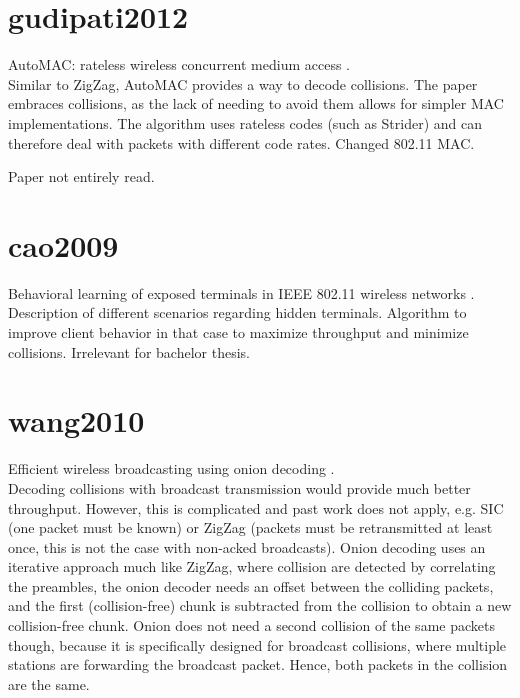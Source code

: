 \section{gudipati2012}

AutoMAC: rateless wireless concurrent medium access \cite{gudipati2012}.\\

Similar to ZigZag, AutoMAC provides a way to decode collisions. The paper embraces collisions, as the lack of needing to avoid them allows for simpler MAC implementations. The algorithm uses rateless codes (such as Strider) and can therefore deal with packets with different code rates. Changed 802.11 MAC.

Paper not entirely read.



\section{cao2009}

Behavioral learning of exposed terminals in IEEE 802.11 wireless networks \cite{cao2009}.\\

Description of different scenarios regarding hidden terminals. Algorithm to improve client behavior in that case to maximize throughput and minimize collisions. Irrelevant for bachelor thesis.



\section{wang2010}

Efficient wireless broadcasting using onion decoding \cite{wang2010}.\\

Decoding collisions with broadcast transmission would provide much better throughput. However, this is complicated and past work does not apply, e.g. SIC (one packet must be known) or ZigZag \cite{gollakota2008} (packets must be retransmitted at least once, this is not the case with non-acked broadcasts). Onion decoding uses an iterative approach much like ZigZag, where collision are detected by correlating the preambles, the onion decoder needs an offset between the colliding packets, and the first (collision-free) chunk is subtracted from the collision to obtain a new collision-free chunk. Onion does not need a second collision of the same packets though, because it is specifically designed for broadcast collisions, where multiple stations are forwarding the broadcast packet. Hence, both packets in the collision are the same.

